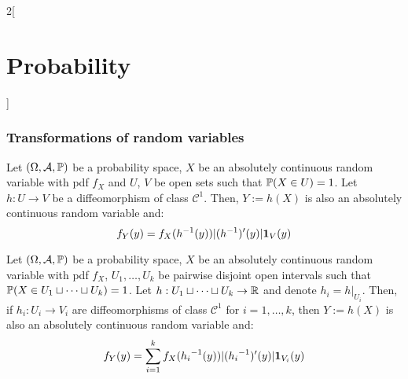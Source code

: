 \documentclass[../../../main.tex]{subfiles}
\begin{document}
\begin{multicols}{2}[\section{Probability}]
    \subsubsection{Transformations of random variables}
    \begin{prop}
        Let $(\Omega,\mathcal{A},\mathbb{P})$ be a probability space, $X$ be an absolutely continuous random variable with pdf $f_X$ and $U$, $V$ be open sets such that $\mathbb{P}(X\in U)=1$. Let $h:U\rightarrow V$ be a diffeomorphism of class $\mathcal{C}^1$. Then, $Y:=h(X)$ is also an absolutely continuous random variable and: $$f_Y(y)=f_X(h^{-1}(y))|(h^{-1})'(y)|\boldsymbol{\mathrm{1}}_V(y)$$
    \end{prop}
    \begin{prop}
        Let $(\Omega,\mathcal{A},\mathbb{P})$ be a probability space, $X$ be an absolutely continuous random variable with pdf $f_X$, $U_1,\ldots, U_k$ be pairwise disjoint open intervals such that $\mathbb{P}(X\in U_1\sqcup \cdots\sqcup U_k)=1$. Let $h:U_1\sqcup \cdots\sqcup U_k\rightarrow \mathbb{R}$ and denote $h_i=h|_{U_i}$. Then, if $h_i:U_i\rightarrow V_i$ are  diffeomorphisms of class $\mathcal{C}^1$ for $i=1,\ldots,k$, then $Y:=h(X)$ is also an absolutely continuous random variable and: $$f_Y(y)=\sum_{i=1}^kf_X({h_i}^{-1}(y))|({h_i}^{-1})'(y)|\boldsymbol{\mathrm{1}}_{V_i}(y)$$
    \end{prop}

\end{multicols}
\end{document}
